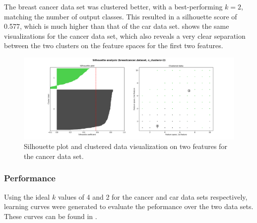 \documentclass{article}
\begin{document}
        The breast cancer data set was clustered better, with a best-performing $k=2$, matching the number of output classes. This resulted in a silhouette score of 0.577, which is much higher than that of the car data set.  shows the same visualizations for the cancer data set, which also reveals a very clear separation between the two clusters on the feature spaces for the first two features.

        \begin{figure}[htb]
        \centering
        \includegraphics[width=\linewidth]{out/kmeans/cancer-2-clusters.png}
        \caption{Silhouette plot and clustered data visualization on two features for the cancer data set.}
        \label{fig:km-silhouette-cancer}
        \end{figure}

      \subsubsection{Performance}
        Using the ideal $k$ values of 4 and 2 for the cancer and car data sets respectively, learning curves were generated to evaluate the peformance over the two data sets. These curves can be found in .
\end{document}
